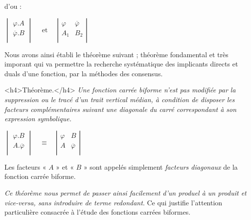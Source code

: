 \begin{itemize}
d'ou : 



\centerline{
 $  \begin{vmatrix}  {\varphi} . A  \\
                                 \overline{ \varphi} . B  \\
                               \end{vmatrix}
                                \quad \text{ et } \quad  
                                \left| \begin{array}{c|c} \varphi  & \overline{\varphi}\\ A_1 & B_2 \\
\end{array} \right| $
}



Nous avons ainsi établi le théorème suivant ; théorème fondamental et très imporant qui va permettre la recherche systématique des implicants directs et duals d'une fonction, par la méthodes des consensus.

<h4>Théorème.</h4>  \emph{Une fonction carrée biforme n'est pas modifiée par la suppression ou le tracé d'un trait vertical médian, à condition de disposer les facteurs complémentaires suivant une diagonale du carré correspondant à son expression symbolique.}



\centerline{
 $  \begin{vmatrix}  {\varphi} . B  \\
                                 A . \overline{ \varphi}   \\
       \end{vmatrix}
                     \quad \equiv \quad 
                                \left| \begin{array}{c|c} 
                                     \varphi  & B \\
                                      A & \overline{\varphi} \\
                                \end{array} \right| $
}



Les facteurs « $A$ » et « $B$ » sont appelés simplement \emph{facteurs diagonaux} de la fonction carrée biforme. 

\emph{Ce théorème nous permet de passer ainsi facilement d'un produel à un produit et vice-versa, sans introduire de terme redondant}. Ce qui justifie l'attention particulière consacrée à l'étude des fonctions carrées biformes. 

\end{itemize}

